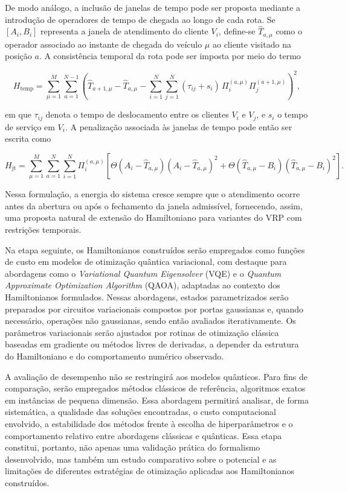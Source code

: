    De modo análogo, a inclusão de janelas de tempo pode ser proposta mediante a introdução de operadores de tempo de chegada ao longo de cada rota. Se $[A_i,B_i]$ representa a janela de atendimento do cliente $V_i$, define-se $\hat{T}_{a,\mu}$ como o operador associado ao instante de chegada do veículo $\mu$ ao cliente visitado na posição $a$. A consistência temporal da rota pode ser imposta por meio do termo

    $$
    H_{\mathrm{temp}}
    =
    \sum_{\mu=1}^{M}\sum_{a=1}^{N-1}
    \left(
    \hat{T}_{a+1,\mu}
    -
    \hat{T}_{a,\mu}
    -
    \sum_{i=1}^{N}\sum_{j=1}^{N}
    (\tau_{ij}+s_i)\,
    \Pi_i^{(a,\mu)}\Pi_j^{(a+1,\mu)}
    \right)^2,
    $$

    \noindent em que $\tau_{ij}$ denota o tempo de deslocamento entre os clientes $V_i$ e $V_j$, e $s_i$ o tempo de serviço em $V_i$. A penalização associada às janelas de tempo pode então ser escrita como

    $$
    H_{\mathrm{jt}}
    =
    \sum_{\mu=1}^{M}\sum_{a=1}^{N}\sum_{i=1}^{N}
    \Pi_i^{(a,\mu)}
    \left[
    \Theta\!\left(A_i-\hat{T}_{a,\mu}\right)\left(A_i-\hat{T}_{a,\mu}\right)^2
    +
    \Theta\!\left(\hat{T}_{a,\mu}-B_i\right)\left(\hat{T}_{a,\mu}-B_i\right)^2
    \right].
    $$

    Nessa formulação, a energia do sistema cresce sempre que o atendimento ocorre antes da abertura ou após o fechamento da janela admissível, fornecendo, assim, uma proposta natural de extensão do Hamiltoniano para variantes do VRP com restrições temporais.

    Na etapa seguinte, os Hamiltonianos construídos serão empregados como funções de custo em modelos de otimização quântica variacional, com destaque para abordagens como o \textit{Variational Quantum Eigensolver} (VQE) e o \textit{Quantum Approximate Optimization Algorithm} (QAOA), adaptadas ao contexto dos Hamiltonianos formulados. Nessas abordagens, estados parametrizados serão preparados por circuitos variacionais compostos por portas gaussianas e, quando necessário, operações não gaussianas, sendo então avaliados iterativamente. Os parâmetros variacionais serão ajustados por rotinas de otimização clássica baseadas em gradiente ou métodos livres de derivadas, a depender da estrutura do Hamiltoniano e do comportamento numérico observado.

    A avaliação de desempenho não se restringirá aos modelos quânticos. Para fins de comparação, serão empregados métodos clássicos de referência, algoritmos exatos em instâncias de pequena dimensão. Essa abordagem permitirá analisar, de forma sistemática, a qualidade das soluções encontradas, o custo computacional envolvido, a estabilidade dos métodos frente à escolha de hiperparâmetros e o comportamento relativo entre abordagens clássicas e quânticas. Essa etapa constitui, portanto, não apenas uma validação prática do formalismo desenvolvido, mas também um estudo comparativo sobre o potencial e as limitações de diferentes estratégias de otimização aplicadas aos Hamiltonianos construídos.


